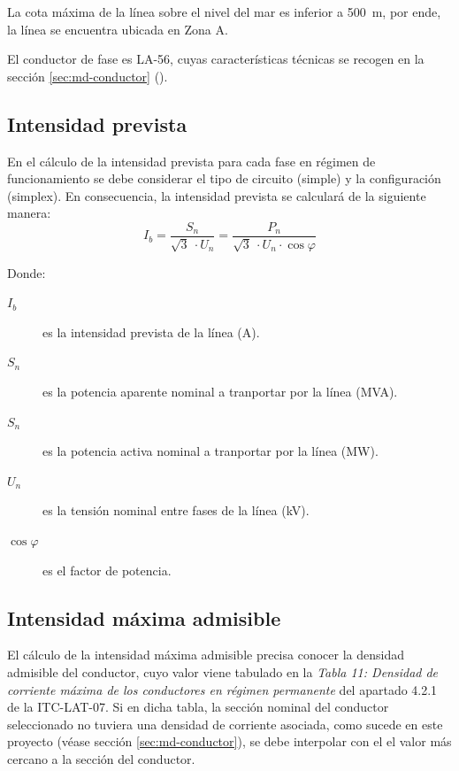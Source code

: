 La cota máxima de la línea sobre el nivel del mar es inferior a \SI{500}{\meter}, por ende, la línea se encuentra ubicada en Zona A.

El conductor de fase es LA-56, cuyas características técnicas se recogen en la sección \ref{sec:md-conductor} ().

\subsection{Intensidad prevista}
\label{subsec:ce-intensidadPrevista}
En el cálculo de la intensidad prevista para cada fase en régimen de funcionamiento se debe considerar el tipo de circuito (simple) y la configuración (simplex). En consecuencia, la intensidad prevista se calculará de la siguiente manera:
\begin{equation}
I_b = \frac{S_n}{\sqrt{3}\ \cdot U_n} = \frac{P_n}{\sqrt{3}\ \cdot U_n \cdot \cos\varphi}
\label{eq:intensidad-prevista}
\end{equation}

Donde:
\begin{description}
  \item[$I_b$] es la intensidad prevista de la línea (\si{\ampere}).
  \item[$S_n$] es la potencia aparente nominal a tranportar por la línea (\si{MVA}).
  \item[$S_n$] es la potencia activa nominal a tranportar por la línea (\si{\mega\watt}).
  \item[$U_n$] es la tensión nominal entre fases de la línea (\si{\kilo\volt}).
  \item[$\cos\varphi$] es el factor de potencia.
\end{description}

\subsection{Intensidad máxima admisible}
\label{subsec:ce-intensidadAdmisible}
El cálculo de la intensidad máxima admisible precisa conocer la densidad admisible del conductor, cuyo valor viene tabulado en la \textit{Tabla 11: Densidad de corriente máxima de los conductores en régimen permanente} del apartado 4.2.1 de la ITC-LAT-07. Si en dicha tabla, la sección nominal del conductor seleccionado no tuviera una densidad de corriente asociada, como sucede en este proyecto (véase sección \ref{sec:md-conductor}), se debe interpolar con el el valor más cercano a la sección del conductor.

